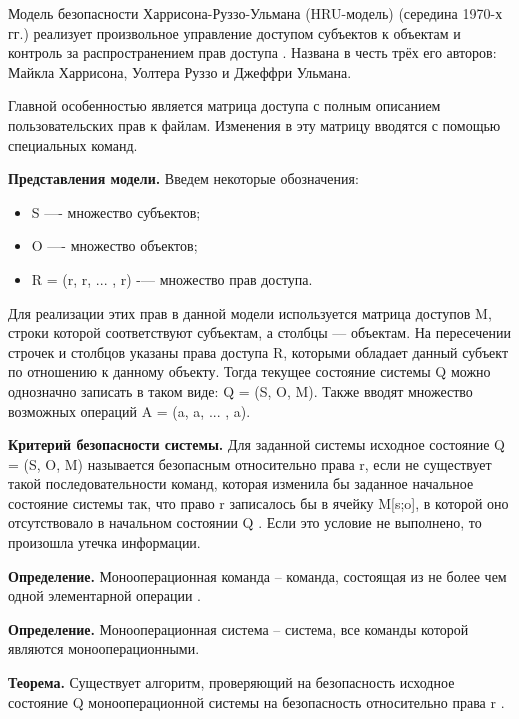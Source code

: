 Модель безопасности Харрисона-Руззо-Ульмана (HRU-модель) (середина 1970-х гг.) реализует произвольное управление 
доступом субъектов к объектам и контроль за распространением прав доступа \autocite{Zegzhda}. Названа в честь 
трёх его авторов: Майкла Харрисона, Уолтера Руззо и Джеффри Ульмана.

Главной особенностью является матрица доступа с полным описанием пользовательских прав к файлам. Изменения в эту 
матрицу вводятся с помощью специальных команд.

\textbf{Представления модели.} Введем некоторые обозначения:
\begin{itemize}
    \item S —- множество субъектов;
    \item O —- множество объектов;
    \item R = (r, r, ... , r) -— множество прав доступа.
\end{itemize}
Для реализации этих прав в данной модели используется матрица доступов M, строки которой соответствуют субъектам, 
а столбцы — объектам. На пересечении строчек и столбцов указаны права доступа R, которыми обладает данный субъект 
по отношению к данному объекту. Тогда текущее состояние системы Q можно однозначно записать в таком виде: 
Q = (S, O, M). Также вводят множество возможных операций A = (a, a, ... , a).

\textbf{Критерий безопасности системы.} Для заданной системы исходное состояние Q = (S, 
O, M) называется безопасным относительно права r, если не существует такой 
последовательности команд, которая изменила бы заданное начальное состояние системы так, что право r записалось бы в 
ячейку M[s;o], в которой оно отсутствовало в начальном состоянии Q \autocite{Zegzhda}. Если это условие не выполнено, 
то произошла утечка информации.

\textbf{Определение.} Монооперационная команда -- команда, состоящая из не более чем одной элементарной операции \autocite{Zegzhda}.

\textbf{Определение.} Монооперационная система -- система, все команды которой являются монооперационными.

\textbf{Теорема.} Существует алгоритм, проверяющий на безопасность исходное состояние Q 
монооперационной системы на безопасность относительно права r \autocite{WikiHRU}.

